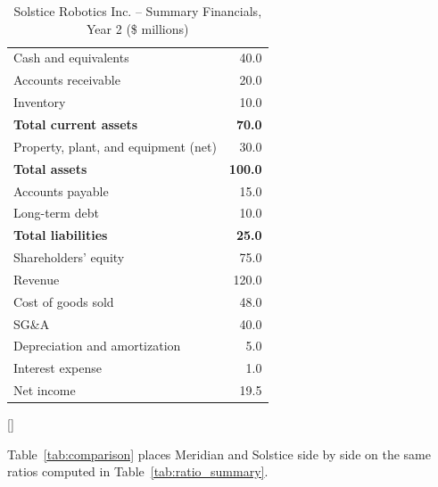 \documentclass[../ai_in_finance]{subfiles}
\begin{document}
\begin{table}[htbp]
\centering
\begin{lrbox}{\bookmeasuredbox}
\begin{tabular}{lr}
\toprule
Cash and equivalents & 40.0 \\
Accounts receivable & 20.0 \\
Inventory & 10.0 \\
\textbf{Total current assets} & \textbf{70.0} \\
Property, plant, and equipment (net) & 30.0 \\
\textbf{Total assets} & \textbf{100.0} \\
\midrule
Accounts payable & 15.0 \\
Long-term debt & 10.0 \\
\textbf{Total liabilities} & \textbf{25.0} \\
Shareholders' equity & 75.0 \\
\midrule
Revenue & 120.0 \\
Cost of goods sold & 48.0 \\
SG\&A & 40.0 \\
Depreciation and amortization & 5.0 \\
Interest expense & 1.0 \\
Net income & 19.5 \\
\bottomrule
\end{tabular}
\end{lrbox}
\ifdim\wd\bookmeasuredbox<0.65\linewidth
\setlength{\bookcapwidth}{0.65\linewidth}
\else
\setlength{\bookcapwidth}{\wd\bookmeasuredbox}
\fi
{}[\bookcapwidth]{
\usebox{\bookmeasuredbox}
}{
\caption{Solstice Robotics Inc. -- Summary Financials, Year 2 (\$ millions)}
\label{tab:solstice}
}
\end{table}

Table~\ref{tab:comparison} places Meridian and Solstice side by side on the same ratios computed in Table~\ref{tab:ratio_summary}.
\end{document}
